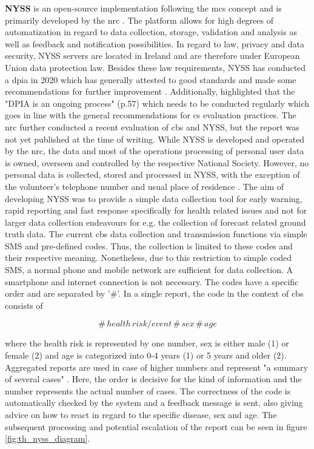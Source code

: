 \textbf{NYSS} is an open-source implementation following the \acrshort{mcs} concept and is primarily developed by the \acrshort{nrc} \autocite{jungCommunityBasedSurveillance2022}. The platform allows for high degrees of automatization in regard to data collection, storage, validation and analysis as well as feedback and notification possibilities.\newline
In regard to law, privacy and data security, NYSS servers are located in Ireland and are therefore under European Union data protection law. Besides these law requirements, NYSS has conducted a \acrfull{dpia} in 2020 which has generally attested to good standards and made some recommendations for further improvement \autocite{quinnNyssDATAPROTECTION2020}. Additionally, \textcite{quinnNyssDATAPROTECTION2020} highlighted that the "DPIA is an ongoing process" (p.57) which needs to be conducted regularly which goes in line with the general recommendations for \acrshort{cs} evaluation practices. The \acrshort{nrc} further conducted a recent evaluation of \acrshort{cbs} and NYSS, but the report was not yet published at the time of writing.\newline
While NYSS is developed and operated by the \acrshort{nrc}, the data and most of the operations processing of personal user data is owned, overseen and controlled by the respective National Society. However, no personal data is collected, stored and processed in NYSS, with the exception of the volunteer's telephone number and usual place of residence \autocite{nrcNYSSCommunitybasedSurveillance2021}.\newline
The aim of developing NYSS was to provide a simple data collection tool for early warning, rapid reporting and fast response specifically for health related issues and not for larger data collection endeavours for e.g. the collection of forecast related ground truth data. The current \acrshort{cbs} data collection and transmission functions via simple SMS and pre-defined codes. Thus, the collection is limited to these codes and their respective meaning. Nonetheless, due to this restriction to simple coded SMS, a normal phone and mobile network are sufficient for data collection. A smartphone and internet connection is not necessary. The codes have a specific order and are separated by '\#'. In a single report, the code in the context of \acrshort{cbs} consists of 

    \[\#\,health\, risk/event\, \#\, sex\, \#\, age\]

where the health risk is represented by one number, sex is either male (1) or female (2) and age is categorized into 0-4 years (1) or 5 years and older (2). Aggregated reports are used in case of higher numbers and represent "a summary of several cases" \autocite[35]{nrcNYSSCommunitybasedSurveillance2021}. Here, the order is decisive for the kind of information and the number represents the actual number of cases. The correctness of the code is automatically checked by the system and a feedback message is sent, also giving advice on how to react in regard to the specific disease, sex and age. The subsequent processing and potential escalation of the report can be seen in figure \ref{fig:th_nyss_diagram}.

